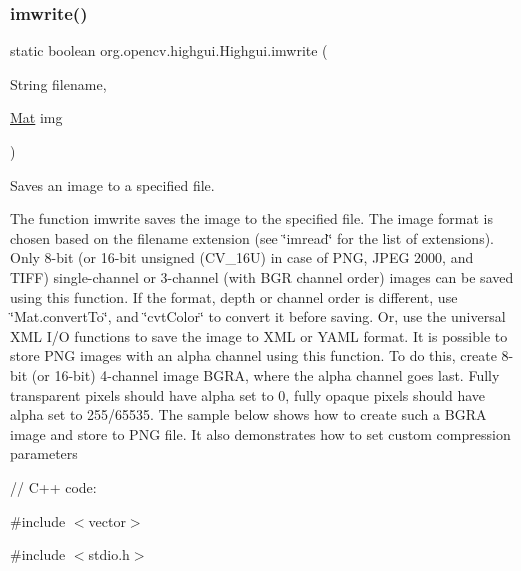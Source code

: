 \subsubsection{\texorpdfstring{imwrite()}{imwrite()}\hspace{0.1cm}{\footnotesize\ttfamily [2/2]}}
{\footnotesize\ttfamily static boolean org.\+opencv.\+highgui.\+Highgui.\+imwrite (\begin{DoxyParamCaption}\item[{String}]{filename,  }\item[{\mbox{\hyperlink{classorg_1_1opencv_1_1core_1_1_mat}{Mat}}}]{img }\end{DoxyParamCaption})\hspace{0.3cm}{\ttfamily [static]}}

Saves an image to a specified file.

The function {\ttfamily imwrite} saves the image to the specified file. The image format is chosen based on the {\ttfamily filename} extension (see \char`\"{}imread\char`\"{} for the list of extensions). Only 8-\/bit (or 16-\/bit unsigned ({\ttfamily C\+V\+\_\+16U}) in case of P\+NG, J\+P\+EG 2000, and T\+I\+FF) single-\/channel or 3-\/channel (with \textquotesingle{}B\+GR\textquotesingle{} channel order) images can be saved using this function. If the format, depth or channel order is different, use \char`\"{}\+Mat.\+convert\+To\char`\"{}, and \char`\"{}cvt\+Color\char`\"{} to convert it before saving. Or, use the universal X\+ML I/O functions to save the image to X\+ML or Y\+A\+ML format. It is possible to store P\+NG images with an alpha channel using this function. To do this, create 8-\/bit (or 16-\/bit) 4-\/channel image B\+G\+RA, where the alpha channel goes last. Fully transparent pixels should have alpha set to 0, fully opaque pixels should have alpha set to 255/65535. The sample below shows how to create such a B\+G\+RA image and store to P\+NG file. It also demonstrates how to set custom compression parameters {\ttfamily }

{\ttfamily }

{\ttfamily }

{\ttfamily // C++ code\+:}

{\ttfamily }

{\ttfamily }

{\ttfamily \#include $<$vector$>$}

{\ttfamily }

{\ttfamily }

{\ttfamily \#include $<$stdio.\+h$>$}

